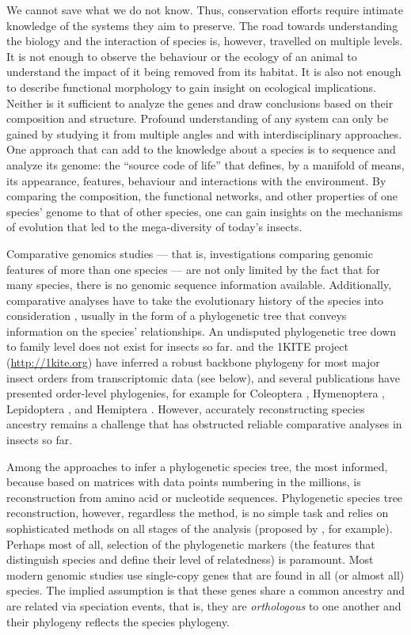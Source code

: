 We cannot save what we do not know.  Thus, conservation efforts require
intimate knowledge of the systems they aim to preserve.  The road towards
understanding the biology and the interaction of species is, however,
travelled on multiple levels.  It is not enough to observe the behaviour
or the ecology of an animal to understand the impact of it being removed
from its habitat.  It is also not enough to describe functional
morphology to gain insight on ecological implications.  Neither is it
sufficient to analyze the genes and draw conclusions based on their
composition and structure.  Profound understanding of any system can only
be gained by studying it from multiple angles and with interdisciplinary
approaches.  One approach that can add to the knowledge about a species
is to sequence and analyze its genome: the ``source code of life'' that
defines, by a manifold of means, its appearance, features, behaviour and
interactions with the environment.  By comparing the composition, the
functional networks, and other properties of one species' genome to that
of other species, one can gain insights on the mechanisms of evolution
that led to the mega-diversity of today's insects.

Comparative genomics studies --- that is, investigations comparing
genomic features of more than one species --- are not only limited by
the fact that for many species, there is no genomic sequence information
available.  Additionally, comparative analyses have to take the
evolutionary history of the species into consideration \citep{Dunn2018},
usually in the form of a phylogenetic tree that conveys information on
the species' relationships.  An undisputed phylogenetic tree down to
family level does not exist for insects so far.  \citet{Misof2014} and
the 1KITE project (\url{http://1kite.org}) have inferred a robust backbone
phylogeny for most major insect orders from transcriptomic data (see
below), and several publications have presented order-level phylogenies,
for example for Coleoptera \citep{McKenna2015}, Hymenoptera
\citep{Peters2017, Branstetter2017}, Lepidoptera \citep{Breinholt2018},
and Hemiptera \citep{Johnson2018}.  However, accurately reconstructing
species ancestry remains a challenge that has obstructed reliable
comparative analyses in insects so far.

Among the approaches to infer a phylogenetic species tree, the most
informed, because based on matrices with data points numbering in the
millions, is reconstruction from amino acid or nucleotide sequences.
Phylogenetic species tree reconstruction, however, regardless the
method, is no simple task and relies on sophisticated methods on all
stages of the analysis (proposed by \citet{Misof2014}, for example).
Perhaps most of all, selection of the phylogenetic markers (the features
that distinguish species and define their level of relatedness) is
paramount.   Most modern genomic studies use single-copy genes that are
found in all (or almost all) species.  The implied assumption is that
these genes share a common ancestry and are related via speciation
events, that is, they are \emph{orthologous} to one another
\citep{Koonin2005} and their phylogeny reflects the species phylogeny.

